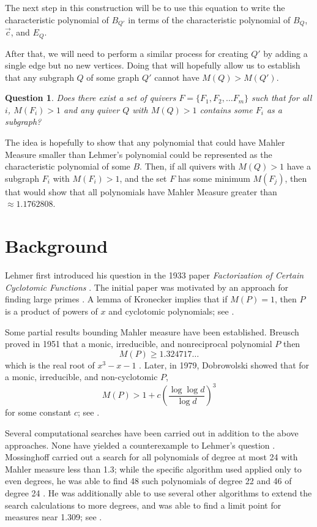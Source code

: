 \documentclass{amsart}
\theoremstyle{theorem}
\theoremstyle{theorem*}
\newtheorem{question}[theorem]{Question}
\theoremstyle{definition}
\begin{document}
The next step in this construction will be to use this equation to write
the characteristic polynomial of $B_{Q'}$ in terms of the characteristic
polynomial of $B_Q$, $\vec{c}$, and $E_Q$.

After that, we will need to perform a similar process for creating $Q'$
by adding a single edge but no new vertices. Doing that will hopefully allow
 us to establish that any subgraph $Q$ of some graph $Q'$ cannot have
 $M(Q) > M(Q')$.

\begin{question}
    Does there exist a set of quivers $F = \{F_1, F_2, \dots F_m\}$ such that
    for all $i$, $M(F_i) > 1$ and any quiver $Q$ with $M(Q) > 1$ contains some
    $F_i$ as a subgraph?
\end{question}

The idea is hopefully to show that any polynomial that could have Mahler Measure
smaller than Lehmer's polynomial could be represented as the characteristic
polynomial of some $B$. Then, if all quivers with $M(Q) > 1$ have a subgraph
$F_i$ with $M(F_i) > 1$, and the set $F$ has some minimum $M(F_j)$, then that
would show that all polynomials have Mahler Measure greater than $\approx
    1.1762808$.

\section*{Background}

Lehmer first introduced his question in the 1933 paper \textit{Factorization of
    Certain Cyclotomic Functions} \cite{l}. The initial paper was motivated by
an approach for finding large primes \cite{ln}. A lemma of Kronecker implies
that if $M(P) = 1$, then $P$ is a product of powers of $x$ and cyclotomic
polynomials; see \cite{ln}.

Some partial results bounding Mahler measure have been established. Breusch
proved in 1951 that a monic, irreducible, and nonreciprocal polynomial $P$ then
$$M(P) \geq 1.324717\dots$$ which is the real root of $x^3 - x - 1$ \cite{ln}.
Later, in 1979, Dobrowolski showed that for a monic, irreducible, and
non-cyclotomic $P$,
$$M(P) > 1 + c \left(\frac{\log \log d}{\log d}\right)^3$$ for some constant $c$;
see \cite{ln}.

Several computational searches have been carried out in addition to the above
approaches. None have yielded a counterexample to Lehmer's question \cite{m}.
Mossinghoff carried out a search for all polynomials of degree at most 24 with
Mahler measure less than 1.3; while the specific algorithm used applied only to
even degrees, he was able to find 48 such polynomials of degree 22 and 46 of
degree 24 \cite{m}. He was additionally able to use several other algorithms to
extend the search calculations to more degrees, and was able to find a limit
point for measures near 1.309; see \cite{m}.
\end{document}
